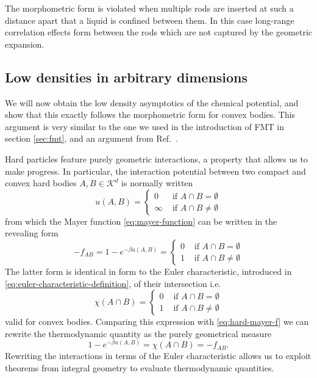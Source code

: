 \documentclass[11pt,twoside]{report}
\begin{document}
The morphometric form is violated when multiple rods are inserted at such a distance apart that a liquid is confined between them.
In this case long-range correlation effects form between the rods which are not captured by the geometric expansion.

\subsection{Low densities in arbitrary dimensions}
\label{sec:low-densities}

We will now obtain the low density asymptotics of the chemical potential, and show that this exactly follows the morphometric form for convex bodies.
This argument is very similar to the one we used in the introduction of FMT in section \ref{sec:fmt}, and an argument from Ref.\ \cite{WertheimMP1994}.

Hard particles feature purely geometric interactions, a property that allows us to make progress.
In particular, the interaction potential between two compact and convex hard bodies $A,B \in \mathcal{K}^d$ is normally written
\begin{equation*}\label{eq:hard-mayer-f}
  u(A,B)
  =
  \begin{cases}
    0 & \textrm{ if } A \cap B = \emptyset \\
    \infty & \textrm{ if } A \cap B \ne \emptyset
  \end{cases}
\end{equation*}
from which the Mayer function \eqref{eq:mayer-function} can be written in the revealing form
\begin{equation*}\label{eq:hard-mayer-f}
  -f_{AB}
  =
  1 - e^{-\beta u(A,B)}
  =
  \begin{cases}
    0 & \textrm{ if } A \cap B = \emptyset \\
    1 & \textrm{ if } A \cap B \ne \emptyset
  \end{cases}
\end{equation*}
The latter form is identical in form to the Euler characteristic, introduced in \eqref{eq:euler-characteristic-definition}, of their intersection i.e.\
\begin{equation*}
  \chi(A \cap B) =
    \begin{cases}
    0 & \textrm{ if } A \cap B = \emptyset \\
    1 & \textrm{ if } A \cap B \ne \emptyset
    \end{cases}
\end{equation*}
valid for convex bodies.
Comparing this expression with \eqref{eq:hard-mayer-f} we can rewrite the thermodynamic quantity as the purely geometrical measure
\begin{equation}\label{eq:chi-replacement}
  1 - e^{-\beta u(A,B)} = \chi(A \cap B) = -f_{AB}.
\end{equation}
Rewriting the interactions in terms of the Euler characteristic allows us to exploit theorems from integral geometry to evaluate thermodynamic quantities.
\end{document}
